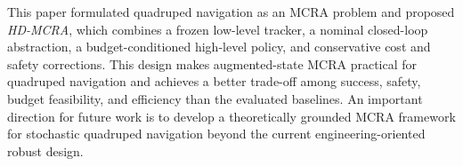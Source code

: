 \documentclass[conference]{IEEEtran}
\begin{document}
This paper formulated quadruped navigation as an MCRA problem and proposed \emph{HD-MCRA}, which combines a frozen low-level tracker, a nominal closed-loop abstraction, a budget-conditioned high-level policy, and conservative cost and safety corrections. This design makes augmented-state MCRA practical for quadruped navigation and achieves a better trade-off among success, safety, budget feasibility, and efficiency than the evaluated baselines. An important direction for future work is to develop a theoretically grounded MCRA framework for stochastic quadruped navigation beyond the current engineering-oriented robust design.



\end{document}
